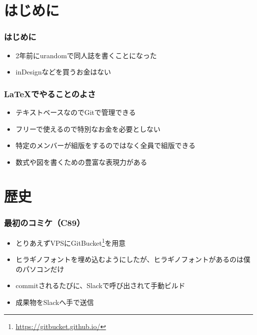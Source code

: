 \section{はじめに}

\begin{frame}
  \frametitle{はじめに}

  \begin{itemize}
    \item<2-> 2年前にurandomで同人誌を書くことになった
    \item<3-> inDesignなどを買うお金はない
  \end{itemize}

  \begin{center}
  \end{center} 
\end{frame}

\begin{frame}
  \frametitle{\LaTeX でやることのよさ}

  \begin{itemize}
    \item<2-> テキストベースなのでGitで管理できる
    \item<3-> フリーで使えるので特別なお金を必要としない
    \item<4-> 特定のメンバーが組版をするのではなく全員で組版できる
    \item<5-> 数式や図を書くための豊富な表現力がある
  \end{itemize}
\end{frame}

\section{歴史}

\begin{frame}
  \frametitle{最初のコミケ（C89）}

  \begin{itemize}
    \item<2-> とりあえずVPSにGitBucket\footnote[frame]{\url{https://gitbucket.github.io/}}を用意
    \item<3-> ヒラギノフォントを埋め込むようにしたが、ヒラギノフォントがあるのは僕のパソコンだけ
    \item<4-> commitされるたびに、Slackで呼び出されて手動ビルド
    \item<5-> 成果物をSlackへ手で送信
  \end{itemize}

  \begin{center}
  \end{center}
\end{frame}

